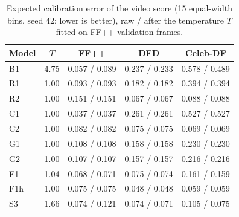 \begin{table}[t]
\centering
\footnotesize
\setlength{\tabcolsep}{3pt}
\caption{Expected calibration error of the video score (15 equal-width bins, seed 42; lower is better), raw / after the temperature $T$ fitted on FF++ validation frames.}
\label{tab:ece}
\begin{tabular}{lcccc}
\toprule
Model & $T$ & FF++ & DFD & Celeb-DF \\
\midrule
B1 & 4.75 & 0.057 / 0.089 & 0.237 / 0.233 & 0.578 / 0.489 \\
R1 & 1.00 & 0.093 / 0.093 & 0.182 / 0.182 & 0.394 / 0.394 \\
R2 & 1.00 & 0.151 / 0.151 & 0.067 / 0.067 & 0.088 / 0.088 \\
C1 & 1.00 & 0.037 / 0.037 & 0.261 / 0.261 & 0.527 / 0.527 \\
C2 & 1.00 & 0.082 / 0.082 & 0.075 / 0.075 & 0.069 / 0.069 \\
G1 & 1.00 & 0.108 / 0.108 & 0.158 / 0.158 & 0.230 / 0.230 \\
G2 & 1.00 & 0.107 / 0.107 & 0.157 / 0.157 & 0.216 / 0.216 \\
F1 & 1.04 & 0.068 / 0.071 & 0.075 / 0.074 & 0.161 / 0.159 \\
F1h & 1.00 & 0.075 / 0.075 & 0.048 / 0.048 & 0.059 / 0.059 \\
S3 & 1.66 & 0.074 / 0.121 & 0.074 / 0.071 & 0.105 / 0.075 \\
\bottomrule
\end{tabular}
\end{table}
